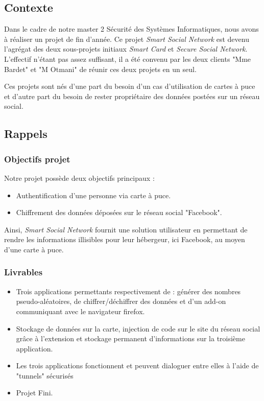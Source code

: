 \documentclass[a4paper,11pt,french]{article}
\begin{document}
\subsection{Contexte}
	Dans le cadre de notre master 2 Sécurité des Systèmes Informatiques,
nous avons à réaliser un projet de fin d'année. Ce projet \emph{Smart Social
Network} est devenu l'agrégat des deux sous-projets initiaux \emph{Smart
Card} et \emph{Secure Social Network}. L'effectif n'étant pas assez 
suffisant, il a été convenu par les deux clients "Mme Bardet" et "M Otmani"
de réunir ces deux projets en un seul.


	Ces projets sont nés d'une part du besoin d'un cas d'utilisation 
de cartes à puce et d'autre part du besoin de rester propriétaire des
données postées sur un réseau social.


\subsection{Rappels}
\subsubsection{Objectifs projet}
	Notre projet possède deux objectifs principaux :
\begin{itemize}
	\item Authentification d'une personne via carte à puce.
	\item Chiffrement des données déposées sur le réseau social
"Facebook".
\end{itemize}

	Ainsi, \emph{Smart Social Network} fournit une solution utilisateur
en permettant de rendre les informations illisibles pour leur hébergeur, ici
Facebook, au moyen d'une carte à puce.

\subsubsection{Livrables}
\begin{itemize}
	\item Trois applications permettants respectivement de : générer des
nombres pseudo-aléatoires, de chiffrer/déchiffrer des données et d'un add-on
communiquant avec le navigateur firefox.
	\item Stockage de données sur la carte, injection de code sur le site
du réseau social grâce à l'extension et stockage permanent d'informations sur
la troisième application.
	\item Les trois applications fonctionnent et peuvent dialoguer entre
elles à l'aide de "tunnels" sécurisés
	\item Projet Fini.
\end{itemize}
\end{document}
